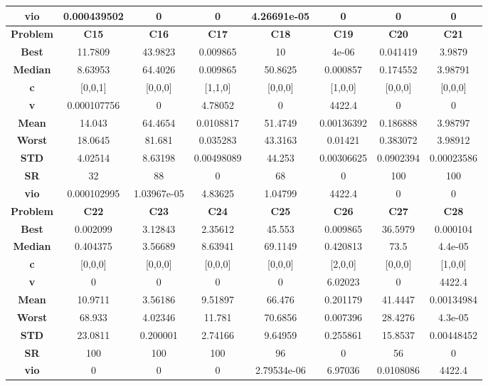 \documentclass{IEEEtran}
\begin{document}
\begin{center}
\begin{tabular}{|c|c|c|c|c|c|c|c|}
    \textbf{vio} & 0.000439502 & 0 & 0 & 4.26691e-05 & 0 & 0 & 0\\ 
    \hline 
    \hline 
    \textbf{Problem} & \textbf{C15} & \textbf{C16} & \textbf{C17} & \textbf{C18} & \textbf{C19} & \textbf{C20} & \textbf{C21} \\ 
    \hline\hline 
    \textbf{Best} & 11.7809 & 43.9823 & 0.009865 & 10 & 4e-06 & 0.041419 & 3.9879\\ 
    \textbf{Median} & 8.63953 & 64.4026 & 0.009865 & 50.8625 & 0.000857 & 0.174552 & 3.98791\\ 
    \textbf{c} & [0,0,1] & [0,0,0] & [1,1,0] & [0,0,0] & [1,0,0] & [0,0,0] & [0,0,0]\\ 
    \textbf{v} & 0.000107756 & 0 & 4.78052 & 0 & 4422.4 & 0 & 0\\ 
    \textbf{Mean} & 14.043 & 64.4654 & 0.0108817 & 51.4749 & 0.00136392 & 0.186888 & 3.98797\\ 
    \textbf{Worst} & 18.0645 & 81.681 & 0.035283 & 43.3163 & 0.01421 & 0.383072 & 3.98912\\ 
    \textbf{STD} & 4.02514 & 8.63198 & 0.00498089 & 44.253 & 0.00306625 & 0.0902394 & 0.00023586\\ 
    \textbf{SR} & 32 & 88 & 0 & 68 & 0 & 100 & 100\\ 
    \textbf{vio} & 0.000102995 & 1.03967e-05 & 4.83625 & 1.04799 & 4422.4 & 0 & 0\\ 
    \hline 
    \hline 
    \textbf{Problem} & \textbf{C22} & \textbf{C23} & \textbf{C24} & \textbf{C25} & \textbf{C26} & \textbf{C27} & \textbf{C28} \\ 
    \hline\hline 
    \textbf{Best} & 0.002099 & 3.12843 & 2.35612 & 45.553 & 0.009865 & 36.5979 & 0.000104\\ 
    \textbf{Median} & 0.404375 & 3.56689 & 8.63941 & 69.1149 & 0.420813 & 73.5 & 4.4e-05\\ 
    \textbf{c} & [0,0,0] & [0,0,0] & [0,0,0] & [0,0,0] & [2,0,0] & [0,0,0] & [1,0,0]\\ 
    \textbf{v} & 0 & 0 & 0 & 0 & 6.02023 & 0 & 4422.4\\ 
    \textbf{Mean} & 10.9711 & 3.56186 & 9.51897 & 66.476 & 0.201179 & 41.4447 & 0.00134984\\ 
    \textbf{Worst} & 68.933 & 4.02346 & 11.781 & 70.6856 & 0.007396 & 28.4276 & 4.3e-05\\ 
    \textbf{STD} & 23.0811 & 0.200001 & 2.74166 & 9.64959 & 0.255861 & 15.8537 & 0.00448452\\ 
    \textbf{SR} & 100 & 100 & 100 & 96 & 0 & 56 & 0\\ 
    \textbf{vio} & 0 & 0 & 0 & 2.79534e-06 & 6.97036 & 0.0108086 & 4422.4\\ 
    \hline 
  \end{tabular}
\end{center}
\newpage
\end{document}
